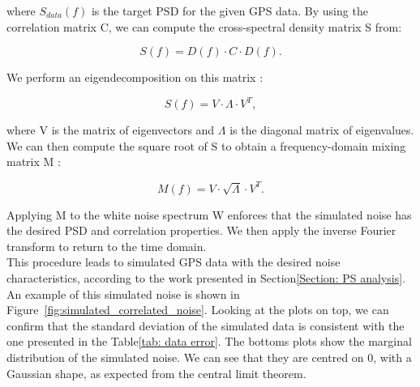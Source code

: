 \documentclass[../../thesis.tex]{subfiles}
\begin{document}
where $S_{data}(f)$ is the target PSD for the given GPS data. By using the correlation matrix C, we can compute the cross-spectral density matrix S from:

\begin{equation}
    S(f) = D(f) \cdot C \cdot D(f).
\end{equation}

We perform an eigendecomposition on this matrix :

\begin{equation}
    S(f) = V \cdot \Lambda \cdot V^T,
\end{equation}

where V is the matrix of eigenvectors and $\Lambda$ is the diagonal matrix of eigenvalues. We can then compute the square root of S to obtain a frequency-domain mixing matrix M :

\begin{equation}
    M(f) = V \cdot \sqrt{\Lambda} \cdot V^T.
\end{equation}

Applying M to the white noise spectrum W enforces that the simulated noise has the desired PSD and correlation properties. We then apply the inverse Fourier transform to return to the time domain. \\
This procedure leads to simulated GPS data with the desired noise characteristics, according to the work presented in Section\ref{Section: PS analysis}. An example of this simulated noise is shown in Figure~\ref{fig:simulated_correlated_noise}. Looking at the plots on top, we can confirm that the standard deviation of the simulated data is consistent with the one presented in the Table\ref{tab: data error}. The bottoms plots show the marginal distribution of the simulated noise. We can see that they are centred on 0, with a Gaussian shape, as expected from the central limit theorem.
\end{document}
